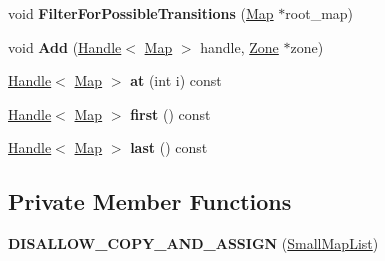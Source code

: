 \begin{DoxyCompactItemize}
\item 
void {\bfseries Filter\+For\+Possible\+Transitions} (\hyperlink{classv8_1_1internal_1_1_map}{Map} $\ast$root\+\_\+map)\hypertarget{classv8_1_1internal_1_1_small_map_list_aedd018bcd6d372f6f47e2bb480e9baf9}{}\label{classv8_1_1internal_1_1_small_map_list_aedd018bcd6d372f6f47e2bb480e9baf9}

\item 
void {\bfseries Add} (\hyperlink{classv8_1_1internal_1_1_handle}{Handle}$<$ \hyperlink{classv8_1_1internal_1_1_map}{Map} $>$ handle, \hyperlink{classv8_1_1internal_1_1_zone}{Zone} $\ast$zone)\hypertarget{classv8_1_1internal_1_1_small_map_list_a966335a627193a7d45798337cf4ea877}{}\label{classv8_1_1internal_1_1_small_map_list_a966335a627193a7d45798337cf4ea877}

\item 
\hyperlink{classv8_1_1internal_1_1_handle}{Handle}$<$ \hyperlink{classv8_1_1internal_1_1_map}{Map} $>$ {\bfseries at} (int i) const \hypertarget{classv8_1_1internal_1_1_small_map_list_a1335aa4b73836d900313d13c40f0fdea}{}\label{classv8_1_1internal_1_1_small_map_list_a1335aa4b73836d900313d13c40f0fdea}

\item 
\hyperlink{classv8_1_1internal_1_1_handle}{Handle}$<$ \hyperlink{classv8_1_1internal_1_1_map}{Map} $>$ {\bfseries first} () const \hypertarget{classv8_1_1internal_1_1_small_map_list_a0d3f13c3c0fe47f4f080b0a16c4711ea}{}\label{classv8_1_1internal_1_1_small_map_list_a0d3f13c3c0fe47f4f080b0a16c4711ea}

\item 
\hyperlink{classv8_1_1internal_1_1_handle}{Handle}$<$ \hyperlink{classv8_1_1internal_1_1_map}{Map} $>$ {\bfseries last} () const \hypertarget{classv8_1_1internal_1_1_small_map_list_ac139913771cb5449ee6c6a6589e0c210}{}\label{classv8_1_1internal_1_1_small_map_list_ac139913771cb5449ee6c6a6589e0c210}

\end{DoxyCompactItemize}
\subsection*{Private Member Functions}
\begin{DoxyCompactItemize}
\item 
{\bfseries D\+I\+S\+A\+L\+L\+O\+W\+\_\+\+C\+O\+P\+Y\+\_\+\+A\+N\+D\+\_\+\+A\+S\+S\+I\+GN} (\hyperlink{classv8_1_1internal_1_1_small_map_list}{Small\+Map\+List})\hypertarget{classv8_1_1internal_1_1_small_map_list_ad722921d16dc6a252952869b5a3bf946}{}\label{classv8_1_1internal_1_1_small_map_list_ad722921d16dc6a252952869b5a3bf946}

\end{DoxyCompactItemize}

